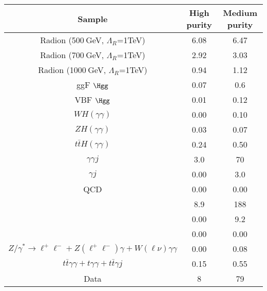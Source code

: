 \begin{tabular}{|c|c|c|}
\hline
Sample & High purity & Medium purity\\
\hline
Radion (500$~$GeV, $\Lambda_R$=1TeV)        &  6.08  & 6.47     \\
Radion (700$~$GeV, $\Lambda_R$=1TeV)        &  2.92  & 3.03     \\
Radion (1000$~$GeV, $\Lambda_R$=1TeV)       &  0.94  & 1.12     \\
\hline
ggF $\Hgg$                &  0.07  &  0.6  \\
VBF $\Hgg$                &  0.01  &  0.12 \\
$WH(\gamma\gamma)$        &  0.00  &  0.10 \\
$ZH(\gamma\gamma)$        &  0.03  &  0.07 \\
$t\bar{t}H(\gamma\gamma)$ &  0.24  &  0.50 \\
\hline
$\gamma\gamma j$                      & 3.0  &  70   \\
$\gamma j$                            & 0.00 &  3.0  \\
QCD                                   & 0.00 &  0.00 \\
& 8.9  &  188  \\
& 0.00 &  9.2  \\ 
& 0.00 &  0.00 \\ 
$Z/\gamma^*\rightarrow\ell^+\ell^- + Z(\ell^+\ell^-)\gamma + W(\ell\nu)\gamma\gamma$ & 0.00 &  0.08 \\
$t\bar{t}\gamma\gamma + t\gamma\gamma + t\bar{t}\gamma j$ & 0.15 &  0.55 \\
\hline
Data                                  & 8 & 79 \\
\hline
\end{tabular}
